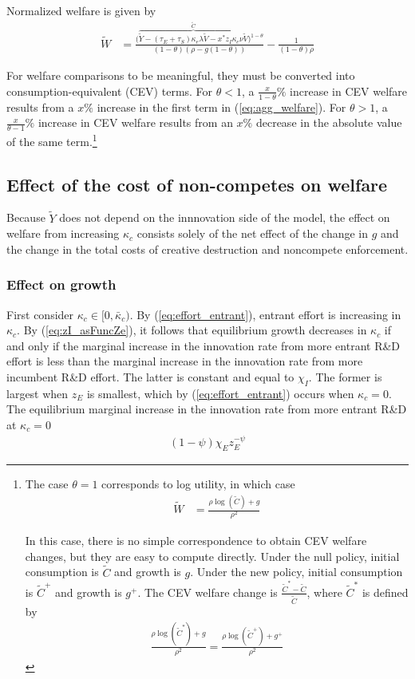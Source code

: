 \documentclass[12pt,english]{article}
\theoremstyle{remark}
\begin{document}
Normalized welfare is given by 
\begin{align}
\tilde{W} &= \frac{\big(\overbrace{\tilde{Y} - (\tau_E + \tau_S) \kappa_{e} \lambda \tilde{V} - x^* z_I \kappa_c \nu \tilde{V}}^{\tilde{C}}\big)^{1-\theta}}{(1-\theta)(\rho - g(1-\theta))} - \frac{1}{(1-\theta)\rho}  \label{eq:agg_welfare}
\end{align}


For welfare comparisons to be meaningful, they must be converted into consumption-equivalent (CEV) terms. For $\theta < 1$, a $\frac{x}{1-\theta}\%$ increase in CEV welfare results from a $x\%$ increase in the first term in (\ref{eq:agg_welfare}). For $\theta > 1$, a $\frac{x}{\theta-1}\%$ increase in CEV welfare results from an $x\%$ decrease in the absolute value of the same term.\footnote{The case $\theta = 1$ corresponds to log utility, in which case
	\begin{align}
	\tilde{W} &= \frac{\rho \log(\tilde{C}) + g}{\rho^2} \label{eq:agg_welfare_log}
	\end{align}
	
	In this case, there is no simple correspondence to obtain CEV welfare changes, but they are easy to compute directly. Under the null policy, initial consumption is $\tilde{C}$ and growth is $g$. Under the new policy, initial consumption is $\tilde{C}^+$ and growth is $g^+$. The CEV welfare change is $\frac{\tilde{C}^* - \tilde{C}}{\tilde{C}}$, where $\tilde{C}^*$ is defined by 
	\begin{align}
	\frac{\rho\log(\tilde{C}^*) + g}{\rho^2} = \frac{\rho \log(\tilde{C}^+) + g^+}{\rho^2} \label{eq:agg_welfare_log_CEV}
	\end{align}}

\subsection{Effect of the cost of non-competes on welfare}

Because $\tilde{Y}$ does not depend on the innnovation side of the model, the effect on welfare from increasing $\kappa_c$ consists solely of the net effect of the change in $g$ and the change in the total costs of creative destruction and noncompete enforcement.

\subsubsection{Effect on growth}

First consider $\kappa_c \in [0, \bar{\kappa}_c)$. By (\ref{eq:effort_entrant}), entrant effort is increasing in $\kappa_c$. By (\ref{eq:zI_asFuncZe}), it follows that equilibrium growth decreases in $\kappa_c$ if and only if the marginal increase in the innovation rate from more entrant R\&D effort is less than the marginal increase in the innovation rate from more incumbent R\&D effort. The latter is constant and equal to $\chi_I$. The former is largest when $z_E$ is smallest, which by (\ref{eq:effort_entrant}) occurs when $\kappa_c = 0$. The equilibrium marginal increase in the innovation rate from more entrant R\&D at $\kappa_c = 0$
\begin{align}
	(1-\psi) \chi_E z_E^{-\psi} 
\end{align}
\end{document}
